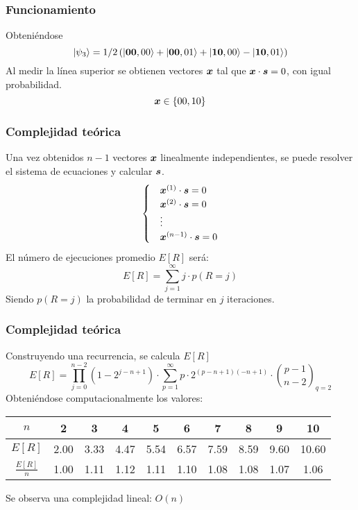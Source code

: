 \begin{frame}
\frametitle{Funcionamiento}

Obteniéndose
\begin{equation*}
	\ket{\psi_3} = 1/2 \left( \ket{\mathbf{00},00} + \ket{\mathbf{00},01} + 
\ket{\mathbf{10},00} - \ket{\mathbf{10},01} \right)
\end{equation*}
Al medir la línea superior se obtienen vectores $\boldsymbol{x}$ tal que $\boldsymbol{x} \cdot \boldsymbol{s} 
= 0$, con igual probabilidad.
$$ \boldsymbol{x} \in \{00, 10\} $$
\end{frame}
\begin{frame}
\frametitle{Complejidad teórica}
Una vez obtenidos $n-1$ vectores $\boldsymbol{x}$ linealmente independientes, se puede 
resolver el sistema de ecuaciones y calcular $\boldsymbol{s}$.
\begin{equation*}
\begin{cases}
	& \boldsymbol{x}^{(1)} \cdot \boldsymbol{s} = 0 \\
	& \boldsymbol{x}^{(2)} \cdot \boldsymbol{s} = 0 \\
	& \vdots \\
	& \boldsymbol{x}^{(n-1)} \cdot \boldsymbol{s} = 0 \\
\end{cases}
\end{equation*}
El número de ejecuciones promedio $E[R]$ será:
$$ E[R] = \sum^{\infty}_{j=1} j \cdot p(R=j) $$
Siendo $p(R=j)$ la probabilidad de terminar en $j$ iteraciones.

\end{frame}
\begin{frame}
\frametitle{Complejidad teórica}

Construyendo una recurrencia, se calcula $E[R]$
$$ E[R] = \prod^{n-2}_{j=0} (1 - 2^{j-n+1}) \cdot \sum_{p=1}^\infty p \cdot 
2^{(p-n+1)(-n+1)} \cdot {p-1 \choose n-2}_{q=2} $$
Obteniéndose computacionalmente los valores:
\begin{center}
	\small
	\begin{tabular}{c*{9}{c}}
		\toprule
		$n$      & 2 & 3 & 4 & 5 & 6 & 7 & 8 & 9 & 10\\
		\midrule
		$E[R]$   &
2.00& 3.33& 4.47& 5.54& 6.57& 7.59& 8.59& 9.60& 10.60
\\
		$\frac{E[R]}{n}$ &
1.00& 1.11& 1.12& 1.11& 1.10& 1.08& 1.08& 1.07& 1.06\\
		\bottomrule
	\end{tabular}
\end{center}

Se observa una complejidad lineal: $O(n)$

\end{frame}
